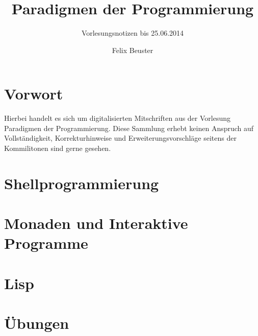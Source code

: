 \documentclass[11pt,a4paper]{scrartcl}
\title{Paradigmen der Programmierung}
\subtitle{Vorlesungsnotizen bis 25.06.2014}
\author{Felix Beuster}
\date{}
\begin{document}
\setlength{\parindent}{0ex}
\maketitle
\newpage
\tableofcontents
\newpage

\section*{Vorwort} %
\label{sec:vorwort}

	Hierbei handelt es sich um digitalisierten Mitschriften aus der Vorlesung Paradigmen der
	Programmierung. Diese Sammlung erhebt keinen Anspruch auf Vollständigkeit, Korrekturhinweise
	und Erweiterungsvorschläge seitens der Kommilitonen sind gerne gesehen.


\section{Shellprogrammierung} %
\label{sec:shellprogrammierung}

\clearpage
\section{Monaden und Interaktive Programme} %
\label{sec:monaden_und_interaktive_programme}

\clearpage
\section{Lisp} %
\label{sec:lisp}




\clearpage
\appendix
\section{Übungen} %
\label{sec:uebungen}
\end{document}
